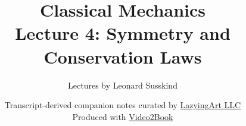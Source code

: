 \documentclass[11pt,oneside]{book}
\begin{document}
\hypersetup{pageanchor=false}
\frontmatter
\title{Classical Mechanics\\[0.45em]
\large Lecture 4: Symmetry and Conservation Laws}
\author{Lectures by Leonard Susskind}
\date{Transcript-derived companion notes curated by
\href{https://lazying.art}{LazyingArt LLC}\\[0.35em]
\small Produced with
\href{https://github.com/lachlanchen/Video2Book}{Video2Book}}
\maketitle
\hypersetup{pageanchor=true}
\mainmatter

\end{document}
